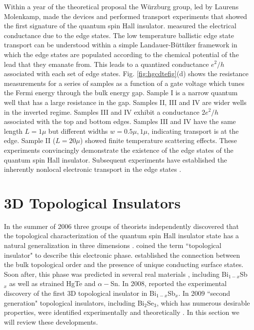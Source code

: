 \documentclass[twocolumn,floatfix,showpacs,rmp,aps]{revtex4}
\begin{document}

Within a year of the theoretical proposal the W\"urzburg group, led by Laurens
Molenkamp, made the devices and performed transport experiments that
showed the first signature of the quantum spin Hall insulator.
\textcite{konig07}
measured the electrical conductance due to the edge states.
The low temperature ballistic edge state transport
can be understood within a simple Landauer-B\"uttiker
\cite{buttiker88}
framework in which the edge states are populated according to the
chemical potential of the lead that they emanate from.  This leads to
a quantized conductance $e^2/h$ associated with each set of edge
states.  Fig. \ref{fig:hgcdtefig}(d) shows the resistance measurements for a series of
samples as a function of a gate voltage which tunes the Fermi energy
through the bulk energy gap.  Sample I is a narrow quantum well
that has a large resistance in the gap.  Samples II, III and IV are
wider wells in the inverted regime.   Samples III and IV exhibit a
conductance $2e^2/h$ associated with the top and bottom edges.  Samples III and IV have
the same length $L = 1\mu$ but different widths
$w = 0.5\mu,1\mu$, indicating transport is at the edge.  Sample
II  ($L=20\mu$) showed finite temperature scattering effects. These
experiments convincingly demonstrate the existence of the edge
states of the quantum spin Hall insulator.  Subsequent
experiments have established the inherently nonlocal electronic
transport in the edge states \cite{roth09}.


\section{3D Topological Insulators}
\label{sec:3d}

In the summer of 2006 three groups of theorists independently discovered that the
topological characterization of the quantum spin Hall insulator state
has a natural generalization in three dimensions \cite{fukanemele07,moorebalents07,roy09b}.
\textcite{moorebalents07} coined the term ``topological
insulator" to describe this electronic phase.  \textcite{fukanemele07} established the
connection between the bulk topological order and the presence of unique conducting surface
states.  Soon after, this phase was predicted in several real materials \cite{fukane07}, including
Bi$_{1-x}$Sb$_x$ as well as strained HgTe and $\alpha-$Sn.  In 2008, \textcite{hsieh08}
reported the experimental discovery of the first 3D topological
insulator in Bi$_{1-x}$Sb$_x$.  In 2009 ``second generation" topological
insulators, including Bi$_2$Se$_3$, which has numerous desirable properties,
were identified experimentally \cite{xia09a} and theoretically \cite{xia09a,zhangh09}.
In this section we will review these developments.
\end{document}
